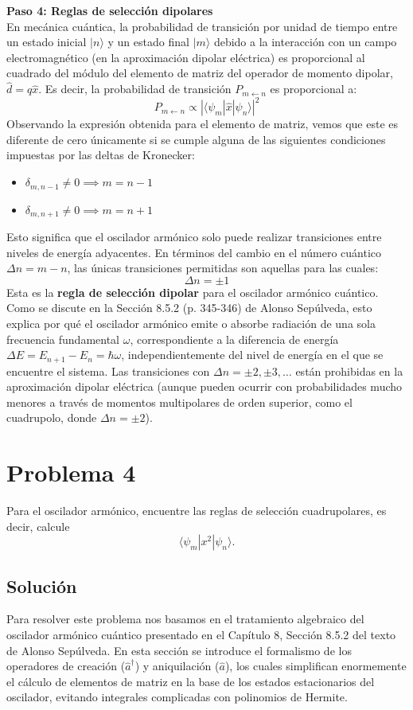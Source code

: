 \documentclass[a4paper]{article}
\begin{document}
\vspace{0.3cm}
\noindent\textbf{Paso 4: Reglas de selección dipolares} \\
En mecánica cuántica, la probabilidad de transición por unidad de tiempo entre un estado inicial $|n\rangle$ y un estado final $|m\rangle$ debido a la interacción con un campo electromagnético (en la aproximación dipolar eléctrica) es proporcional al cuadrado del módulo del elemento de matriz del operador de momento dipolar, $\hat{d} = q\hat{x}$. Es decir, la probabilidad de transición $P_{m \leftarrow n}$ es proporcional a:
$$
P_{m \leftarrow n} \propto |\langle \psi_m | \hat{x} | \psi_n \rangle|^2
$$
Observando la expresión obtenida para el elemento de matriz, vemos que este es diferente de cero únicamente si se cumple alguna de las siguientes condiciones impuestas por las deltas de Kronecker:
\begin{itemize}
    \item $\delta_{m, n-1} \neq 0 \implies m = n - 1$
    \item $\delta_{m, n+1} \neq 0 \implies m = n + 1$
\end{itemize}
Esto significa que el oscilador armónico solo puede realizar transiciones entre niveles de energía adyacentes. En términos del cambio en el número cuántico $\Delta n = m - n$, las únicas transiciones permitidas son aquellas para las cuales:
$$
\Delta n = \pm 1
$$
Esta es la \textbf{regla de selección dipolar} para el oscilador armónico cuántico. Como se discute en la Sección 8.5.2 (p. 345-346) de Alonso Sepúlveda, esto explica por qué el oscilador armónico emite o absorbe radiación de una sola frecuencia fundamental $\omega$, correspondiente a la diferencia de energía $\Delta E = E_{n+1} - E_n = \hbar\omega$, independientemente del nivel de energía en el que se encuentre el sistema. Las transiciones con $\Delta n = \pm 2, \pm 3, \dots$ están prohibidas en la aproximación dipolar eléctrica (aunque pueden ocurrir con probabilidades mucho menores a través de momentos multipolares de orden superior, como el cuadrupolo, donde $\Delta n = \pm 2$).

\section{Problema 4}
Para el oscilador armónico, encuentre las reglas de selección cuadrupolares, es decir, calcule
$$
\langle \psi_m | x^2 | \psi_n \rangle.
$$

\subsection{Solución}
Para resolver este problema nos basamos en el tratamiento algebraico del oscilador armónico cuántico presentado en el Capítulo 8, Sección 8.5.2 del texto de Alonso Sepúlveda. En esta sección se introduce el formalismo de los operadores de creación ($\hat{a}^\dagger$) y aniquilación ($\hat{a}$), los cuales simplifican enormemente el cálculo de elementos de matriz en la base de los estados estacionarios del oscilador, evitando integrales complicadas con polinomios de Hermite.
\end{document}
